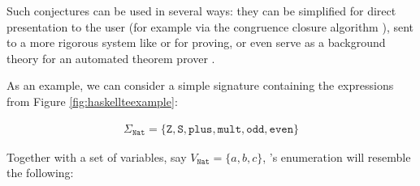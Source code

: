 \iffalse
\begin{enumerate}
\item Given a typed signature $\Sigma$ and set of variables $V$, \qspec{}
  generates a list $terms$ containing the constants (including functions) from
  $\Sigma$, the variables from $V$ and type-correct function applications
  \hs{f x}, where \hs{f} and \hs{x} are elements of $terms$. To ensure the list
  is finite, function applications are only nested up to a specified depth (by
  default, 3).
\item The elements of $terms$ are grouped into equivalence classes, based on
  their type.
\item The equivalence of terms in each class is tested using \qcheck{}:
  variables are instantiated to particular values, generated randomly, and the
  resulting closed expressions are evaluated and compared for equality.
\item If a class is found to have non-equal members, it is split up to separate
  those members.
\item The previous steps of testing and splitting are repeated until the classes
  stabilise (i.e. no differences have been observed for some specified number of
  repetitions).
\item For each class, one member is selected and equations are conjectured that
  it is equal to each of the other members.
\item A congruence closure algorithm is applied to these equations, to discard
  any which are implied by the others.
\end{enumerate}
\fi

Such conjectures can be used in several ways: they can be simplified for direct
presentation to the user (for example via the congruence closure algorithm
\iffalse\cite{TODO}\fi), sent to a more rigorous system like \hspec{} or
\hipster{} for proving, or even serve as a background theory for an
automated theorem prover \cite{claessen2013automating}.

As an example, we can consider a simple signature containing the expressions
from Figure \ref{fig:haskellteexample}:

\begin{align*}
  \Sigma_{\texttt{Nat}} = \{\texttt{Z}, \texttt{S}, \texttt{plus}, \texttt{mult}, \texttt{odd}, \texttt{even}\}
\end{align*}

Together with a set of variables, say $V_{\texttt{Nat}} = \{a, b, c\}$,
\qspec{}'s enumeration will resemble the following:


